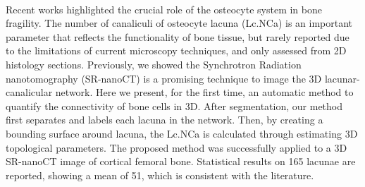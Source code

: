 {{{\begin{enumerate}
 \\ \aabstract
Recent works highlighted the crucial role of the osteocyte system in bone fragility. The number of canaliculi of osteocyte lacuna (Lc.NCa) is an important parameter that reflects the functionality of bone tissue, but rarely reported due to the limitations of current microscopy techniques, and only assessed from 2D histology sections. Previously, we showed the Synchrotron Radiation nanotomography (SR-nanoCT) is a promising technique to image the 3D lacunar-canalicular network. Here we present, for the first time, an automatic method to quantify the connectivity of bone cells in 3D. After segmentation, our method first separates and labels each lacuna in the network. Then, by creating a bounding surface around lacuna, the Lc.NCa is calculated through estimating 3D topological parameters. The proposed method was successfully applied to a 3D SR-nanoCT image of cortical femoral bone. Statistical results on 165 lacunae are reported, showing a mean of 51, which is consistent with the literature.
 

\end{enumerate}}}}
